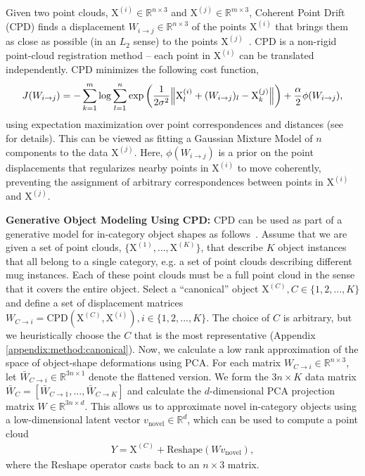 \documentclass{article}
\newcommand{\pcx}[1]{\mathrm{X}^{(#1)}}
\newcommand{\wxy}[2]{W_{#1 \rightarrow #2}}
\newcommand{\bwxy}[2]{\bar{W}_{#1 \rightarrow #2}}
\newcommand{\pci}{\pcx{i}}
\newcommand{\pcj}{\pcx{j}}
\newcommand{\pcc}{\pcx{C}}
\newcommand{\wij}{\wxy{i}{j}}
\begin{document}
Given two point clouds, $\pci \in \mathbb{R}^{n \times 3}$ and $\pcj \in \mathbb{R}^{m \times 3}$, Coherent Point Drift (CPD) finds a displacement $\wij  \in \mathbb{R}^{n \times 3}$ of the points $\pci$ that brings them as close as possible (in an $L_2$ sense) to the points $\pcj$~\cite{myronenko10pointset}. CPD is a non-rigid point-cloud registration method -- each point in $\pci$ can be translated independently. CPD minimizes the following cost function,
\begin{align} %
    J(\wij) = - \sum_{k=1}^{m} \log \sum_{l=1}^{n} \exp \left( \frac{1}{2 \sigma^2} \norm{\pci_l + (W_{i \rightarrow j})_l - \pcj_k } \right) + \frac{\alpha}{2} \phi(\wij),
\end{align}
using expectation maximization over point correspondences and distances (see~\cite{myronenko10pointset} for details). This can be viewed as fitting a Gaussian Mixture Model of $n$ components to the data $\pcj$. Here, $\phi(\wij)$ is a prior on the point displacements that regularizes nearby points in $\pci$ to move coherently, preventing the assignment of arbitrary correspondences between points in $\pci$ and $\pcj$.

\textbf{Generative Object Modeling Using CPD:} CPD can be used as part of a generative model for in-category object shapes as follows~\cite{rodriguez18transferring}. Assume that we are given a set of point clouds, $\{\pcx{1}, \dots, \pcx{K}\}$, that describe $K$ object instances that all belong to a single category, e.g. a set of point clouds describing different mug instances. Each of these point clouds must be a full point cloud in the sense that it covers the entire object. Select a ``canonical'' object $\pcx{C}, C \in \{1,2, ..., K\}$ and define a set of displacement matrices $\wxy{C}{i} = \mathrm{CPD}(\pcx{C}, \pcx{i}), i \in \{1, 2, ..., K\}$. The choice of $C$ is arbitrary, but we heuristically choose the $C$ that is the most representative (Appendix \ref{appendix:method:canonical}). Now, we calculate a low rank approximation of the space of object-shape deformations using PCA. For each matrix $\wxy{C}{i} \in \mathbb{R}^{n \times 3}$, let $\bwxy{C}{i} \in \mathbb{R}^{3n \times 1}$ denote the flattened version. We form the $3n \times K$ data matrix $\bar{W}_C = \left[\bwxy{C}{1}, \dots, \bwxy{C}{K}\right]$ and calculate the $d$-dimensional PCA projection matrix $W \in \mathbb{R}^{3n \times d}$. This allows us to approximate novel in-category objects using a low-dimensional latent vector $v_{\mathrm{novel}} \in \mathbb{R}^d$, which can be used to compute a point cloud
\begin{align}
Y = \pcc + \mathrm{Reshape}(W v_{\mathrm{novel}}),
\label{eq:background:warp}
\end{align}
where the $\mathrm{Reshape}$ operator casts back to an $n \times 3$ matrix.
\end{document}

